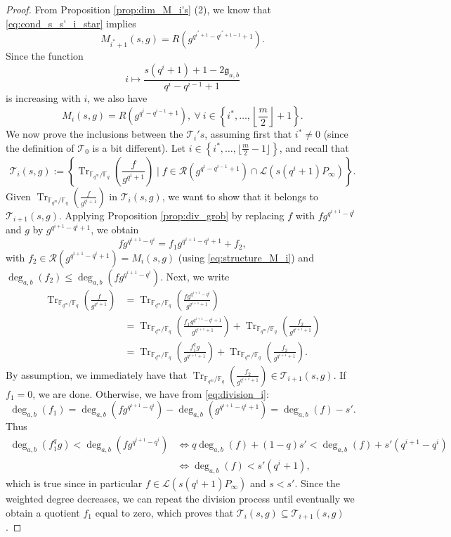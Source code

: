 \documentclass[a4paper]{amsart}
\theoremstyle{definition}
\theoremstyle{remark}
\newcommand{\calL}{\mathcal{L}}
\newcommand{\calR}{\mathcal{R}}
\newcommand{\calT}{\mathcal{T}}
\newcommand{\fq}{\mathbb{F}_{q}}
\newcommand{\Tr}[1]{\operatorname{Tr}_{\mathbb{F}_{q^m}/\fq}\left(#1\right)}
\newcommand{\set}[1]{\left\{#1\right\}}
\newcommand{\degab}[1]{\deg_{a,b}\left(#1\right)}
\begin{document}
\begin{proof}
From Proposition \ref{prop:dim_M_i's} (2), we know that \eqref{eq:cond_s_s'_i_star} implies $$M_{i^*+1}(s,g) = R(g^{q^{i^*+1}-q^{i^*+1-1}+1}).$$ 
Since the function $$i \mapsto \dfrac{s(q^i+1)+1-2\mathfrak{g}_{a,b}}{q^i-q^{i-1}+1}$$ 
is increasing with $i$, we also have
\begin{equation} \label{eq:structure_M_i}
M_{i}(s,g) = R(g^{q^{i}-q^{i-1}+1}), \ \forall \ i \in \set{i^*,\dots,\left\lfloor \frac{m}{2}\right\rfloor+1}.
\end{equation} 
We now prove the inclusions between the $\calT_i's$, assuming first that $i^* \neq 0$ (since the definition of $\calT_0$ is a bit different). Let $i \in \set{i^*,\dots,\lfloor \frac{m}{2}-1 \rfloor}$, and recall that 
$$\calT_i(s,g) := \set{\Tr{\frac{f}{g^{q^i+1}}} \mid f \in \calR(g^{q^i-q^{i-1}+1})\cap \calL(s(q^i+1)P_\infty)}.$$
Given $\Tr{\frac{f}{g^{q^i+1}}}$ in $\calT_i(s,g)$, we want to show that it belongs to $\calT_{i+1}(s,g)$. Applying Proposition \ref{prop:div_grob} by replacing $f$ with $fg^{q^{i+1}-q^i}$ and $g$ by $g^{q^{i+1}-q^i+1}$, we obtain
\begin{equation} \label{eq:division_i}
fg^{q^{i+1}-q^i} = f_1g^{q^{i+1}-q^i+1} + f_2,
\end{equation}
with $f_2 \in \calR(g^{q^{i+1}-q^i+1}) = M_i(s,g)$ (using \eqref{eq:structure_M_i}) and $\degab{f_2} \leq \degab{fg^{q^{i+1}-q^i}}$. Next, we write
\begin{align*}
    \Tr{\frac{f}{g^{q^i+1}}} &= \Tr{\frac{fg^{q^{i+1}-q^i}}{g^{q^{i+1}+1}}} \\
                             &= \Tr{\frac{f_1g^{q^{i+1}-q^i+1}}{g^{q^{i+1}+1}}} + \Tr{\frac{f_2}{g^{q^{i+1}+1}}} \\
                             &= \Tr{\frac{f_1^qg}{g^{q^{i+1}+1}}} + \Tr{\frac{f_2}{g^{q^{i+1}+1}}}.
\end{align*}
By assumption, we immediately have that $\Tr{\frac{f_2}{g^{q^{i+1}+1}}} \in \calT_{i+1}(s,g).$
If $f_1=0$, we are done. Otherwise, we have from \eqref{eq:division_i}:
$$\degab{f_1} = \degab{fg^{q^{i+1}-q^i}} - \degab{g^{q^{i+1}-q^i+1}} = \degab{f}-s'.$$
Thus
\begin{align*}
     \degab{f_1^qg} < \degab{fg^{q^{i+1}-q^i}} & \iff q\degab{f} +(1-q)s' < \degab{f} +s'(q^{i+1}-q^i) \\
                                               & \iff \degab{f} < s'(q^{i}+1),
\end{align*}
which is true since in particular $f \in \calL(s(q^i+1)P_\infty)$ and $s<s'$. Since the weighted degree decreases, we can repeat the division process until eventually we obtain a quotient $f_1$ equal to zero, which proves that $\calT_i(s,g) \subseteq \calT_{i+1}(s,g)$.


\end{proof}
\end{document}
